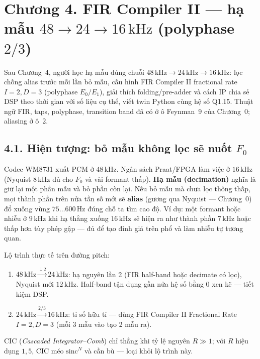 \clearpage
{}
\section*{Chương 4. FIR Compiler II --- hạ mẫu $48\to 24\to 16\,\text{kHz}$ (polyphase $2/3$)}

\begin{learningobj}
Sau Chương~4, người học hạ mẫu đúng chuỗi $48\,\text{kHz}\to 24\,\text{kHz}\to 16\,\text{kHz}$: lọc chống alias trước mỗi lần bỏ mẫu, cấu hình FIR Compiler II fractional rate $I=2,D=3$ (polyphase $E_0/E_1$), giải thích folding/pre-adder và cách IP chia sẻ DSP theo thời gian với số liệu cụ thể, viết twin Python cùng hệ số Q1.15. Thuật ngữ FIR, taps, polyphase, transition band đã có ở ô Feynman~9 của Chương~0; aliasing ở ô~2.
\end{learningobj}

\subsection*{4.1. Hiện tượng: bỏ mẫu không lọc sẽ nuốt $F_0$}

\begin{physicalinsight}
Codec WM8731 xuất PCM ở $48\,\text{kHz}$. Ngân sách Praat/FPGA làm việc ở $16\,\text{kHz}$ (Nyquist $8\,\text{kHz}$ đủ cho $F_0$ và vài formant thấp). \textbf{Hạ mẫu (decimation)} nghĩa là giữ lại một phần mẫu và bỏ phần còn lại. Nếu bỏ mẫu mà chưa lọc thông thấp, mọi thành phần trên nửa tần số mới sẽ \textbf{alias} (gương qua Nyquist --- Chương~0) đổ xuống vùng $75\ldots 600\,\text{Hz}$ đúng chỗ ta tìm cao độ. Ví dụ: một formant hoặc nhiễu ở $9\,\text{kHz}$ khi hạ thẳng xuống $16\,\text{kHz}$ sẽ hiện ra như thành phần $7\,\text{kHz}$ hoặc thấp hơn tùy phép gập --- đủ để tạo đỉnh giả trên phổ và làm nhiễu tự tương quan.
\end{physicalinsight}

Lộ trình thực tế trên đường pitch:
\begin{enumerate}[leftmargin=1.4em]
  \item $48\,\text{kHz}\xrightarrow{\downarrow 2}24\,\text{kHz}$: hạ nguyên lần 2 (FIR half-band hoặc decimate có lọc), Nyquist mới $12\,\text{kHz}$. Half-band tận dụng gần nửa hệ số bằng 0 xen kẽ --- tiết kiệm DSP.
  \item $24\,\text{kHz}\xrightarrow{2/3}16\,\text{kHz}$: tỉ số hữu tỉ --- dùng FIR Compiler II Fractional Rate $I=2,D=3$ (mỗi 3 mẫu vào tạo 2 mẫu ra).
\end{enumerate}
CIC (\emph{Cascaded Integrator--Comb}) chỉ thắng khi tỷ lệ nguyên $R\gg 1$; với $R$ hiệu dụng $1{,}5$, CIC méo $\mathrm{sinc}^N$ và cần bù --- loại khỏi lộ trình này.

